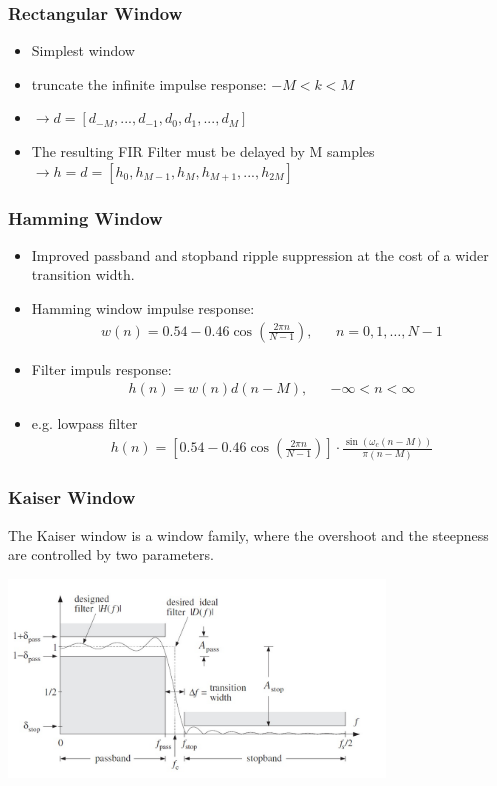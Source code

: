\subsubsection{Rectangular Window}
\begin{itemize}
	\item Simplest window
	\item truncate the infinite impulse response: $-M < k < M$
	\item $\rightarrow d = [d_{-M}, ..., d_{-1}, d_0, d_1, ..., d_M]$
	\item The resulting FIR Filter must be delayed by M samples \newline
	$\rightarrow h = d = [h_0, h_{M-1}, h_M, h_{M+1}, ..., h_{2M}]$
\end{itemize}


\subsubsection{Hamming Window}
\begin{itemize}
	\item Improved passband and stopband ripple suppression at the cost of a wider transition width.
	\item Hamming window impulse response:
	\begin{align*}
		w(n) = 0.54 -0.46\cos\left(\frac{2\pi n}{N-1}\right),&&n= 0,1,\dots,N-1
	\end{align*}
	\item Filter impuls response:
	\begin{align*}
		h(n) = w(n)d(n-M),&&-\infty < n < \infty
	\end{align*}
	\item e.g. lowpass filter
	\begin{align*}
		h(n) = \left[0.54 -0.46\cos\left(\frac{2\pi n}{N-1}\right)\right]\cdot\frac{\sin(\omega_c(n-M))}{\pi (n-M)}
	\end{align*}
\end{itemize}

\newpage
\subsubsection{Kaiser Window}
The Kaiser window is a window family, where the overshoot and the steepness
are controlled by two parameters. \\

\begin{center}
	\includegraphics[width=10cm]{images/FIR_KaiserSpecs.jpg}
\end{center}


